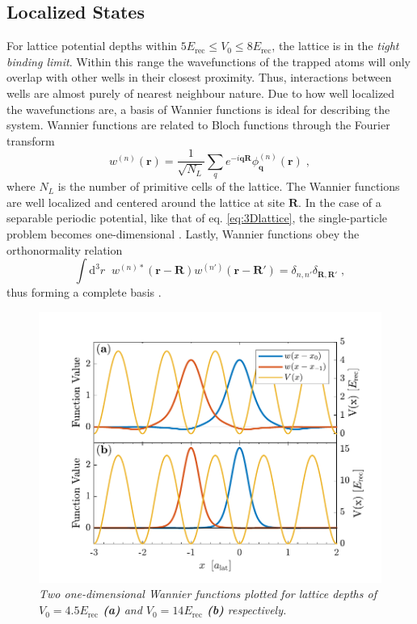 \subsection{Localized States}
For lattice potential depths within $5 E_{\mathrm{rec}} \leq V_0 \leq 8 E_{\mathrm{rec}}$, the lattice is in the \textit{tight binding limit}. Within this range the wavefunctions of the trapped atoms will only overlap with other wells in their closest proximity. Thus, interactions between wells are almost purely of nearest neighbour nature. Due to how well localized the wavefunctions are, a basis of Wannier functions is ideal for describing the system. Wannier functions are related to Bloch functions through the Fourier transform \cite{kittel1963}
\begin{equation}
	w^{(n)}(\boldsymbol{r}) = \frac{1}{\sqrt{N_L}} \sum_{q} e^{ -i \boldsymbol{q} \boldsymbol{R} } \phi_{\boldsymbol{q}}^{(n)}(\boldsymbol{r}) \; ,
\end{equation} 
where $N_L$ is the number of primitive cells of the lattice. The Wannier functions are well localized and centered around the lattice at site $\boldsymbol{R}$. In the case of a separable periodic potential, like that of eq. \eqref{eq:3Dlattice}, the single-particle problem becomes one-dimensional \cite{kohn1959analyticWannier}. Lastly, Wannier functions obey the orthonormality relation
\begin{equation}
	\int \mathrm{d^3}r \; \; w^{(n) *}(\boldsymbol{r} - \boldsymbol{R}) w^{(n')}(\boldsymbol{r} - \boldsymbol{R'}) = \delta_{n,n'} \delta_{\boldsymbol{R},\boldsymbol{R}'} \; ,
\end{equation}
thus forming a complete basis \cite{manybodyBloch}. 
\begin{figure}[!h]
	\centering
	\includegraphics[width=0.8\columnwidth]{Figures/WannierFunctions.pdf} 
	\caption{\textit{Two one-dimensional Wannier functions plotted for lattice depths of $V_0 = 4.5 E_{\mathrm{rec}}$ \textbf{(a)} and $V_0 = 14 E_{\mathrm{rec}}$ \textbf{(b)} respectively.}}
	\label{fig:WannierPlot} 
\end{figure}
